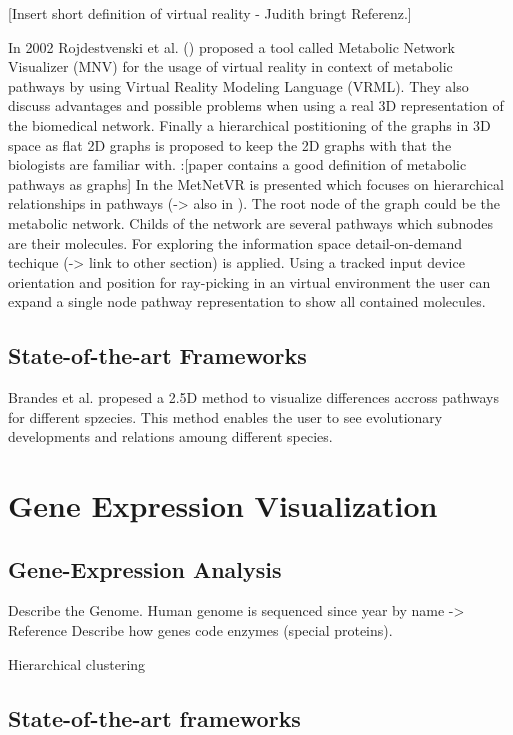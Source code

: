 [Insert short definition of virtual reality - Judith bringt Referenz.]

In 2002 Rojdestvenski et al. (\cite{Rojdestvenski2002, Rojdestvenski2003}) proposed a tool called Metabolic Network Visualizer (MNV) for the usage of virtual reality in context of metabolic pathways by using Virtual Reality Modeling Language (VRML). They also discuss advantages and possible problems when using a real 3D representation of the biomedical network. Finally a hierarchical postitioning of the graphs in 3D space as flat 2D graphs is proposed to keep the 2D graphs with that the biologists are familiar with. 
\cite{Dickerson2003}:[paper contains a good definition of metabolic pathways as graphs]
In \cite{Yang2006} the MetNetVR is presented which focuses on hierarchical relationships in pathways (-> also in \cite{Dogrusoz2004}). The root node of the graph could
be the metabolic network. Childs of the network are several pathways which subnodes are their molecules. For exploring the information space detail-on-demand techique (-> link to other section) is applied. Using a tracked input device orientation and position for  ray-picking in an virtual environment the user can expand a single node pathway representation to show all contained molecules.

\subsection{State-of-the-art Frameworks}

Brandes et al. propesed a 2.5D method to visualize differences accross pathways for different spzecies\cite{Brandes2004}. This method enables the user to see evolutionary developments and relations amoung different species.

\section{Gene Expression Visualization}

\subsection{Gene-Expression Analysis}

Describe the Genome.
Human genome is sequenced since year by name -> Reference 
Describe how genes code enzymes (special proteins).

Hierarchical clustering\cite{Seo2002}

\subsection{State-of-the-art frameworks}

